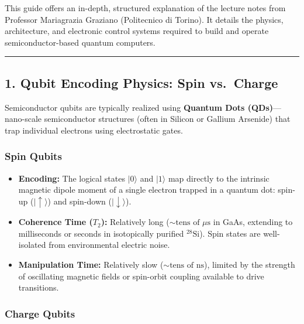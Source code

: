 \documentclass[
]{article}
\providecommand{\tightlist}{%
  \setlength{\itemsep}{0pt}\setlength{\parskip}{0pt}}
\begin{document}
This guide offers an in-depth, structured explanation of the lecture
notes from Professor Mariagrazia Graziano (Politecnico di Torino). It
details the physics, architecture, and electronic control systems
required to build and operate semiconductor-based quantum computers.

\begin{center}\rule{0.5\linewidth}{0.5pt}\end{center}

\subsection{1. Qubit Encoding Physics: Spin
vs.~Charge}\label{qubit-encoding-physics-spin-vs.-charge}

Semiconductor qubits are typically realized using \textbf{Quantum Dots
(QDs)}---nano-scale semiconductor structures (often in Silicon or
Gallium Arsenide) that trap individual electrons using electrostatic
gates.

\subsubsection{Spin Qubits}\label{spin-qubits}

\begin{itemize}
\tightlist
\item
  \textbf{Encoding:} The logical states \(|0\rangle\) and \(|1\rangle\)
  map directly to the intrinsic magnetic dipole moment of a single
  electron trapped in a quantum dot: spin-up (\(|\uparrow\rangle\)) and
  spin-down (\(|\downarrow\rangle\)).
\item
  \textbf{Coherence Time (\(T_2\)):} Relatively long
  (\(\sim \text{tens of }\mu\text{s}\) in GaAs, extending to
  milliseconds or seconds in isotopically purified \(^{28}\text{Si}\)).
  Spin states are well-isolated from environmental electric noise.
\item
  \textbf{Manipulation Time:} Relatively slow
  (\(\sim \text{tens of ns}\)), limited by the strength of oscillating
  magnetic fields or spin-orbit coupling available to drive transitions.
\end{itemize}

\subsubsection{Charge Qubits}\label{charge-qubits}
\end{document}
